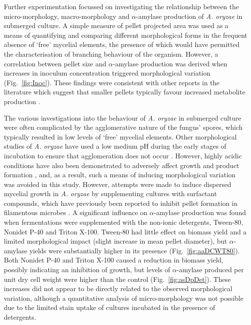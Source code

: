 Further experimentation focussed on investigating the relationship between the micro-morphology, macro-morphology and $\alpha$-amylase production of \emph{A. oryzae} in submerged culture. A simple measure of pellet projected area was used as a means of quantifying and comparing different morphological forms in the frequent absence of \lq free' mycelial elements, the presence of which would have permitted the characterisation of branching behaviour of the organism. However, a correlation between pellet size and $\alpha$-amylase production was derived when increases in inoculum concentration triggered morphological variation (Fig.~\ref{fig:Inoc}). These findings were consistent with other reports in the literature which suggest that smaller pellets typically favour increased metabolite production \cite{xu2000,jppark2002,couri2003,elenshasy2006}.

The various investigations into the behaviour of \emph{A. oryzae} in submerged culture were often complicated by the agglomerative nature of the fungus' spores, which typically resulted in low levels of \lq free' mycelial elements. Other morphological studies of \emph{A. oryzae} have used a low medium pH during the early stages of incubation to ensure that agglomeration does not occur \cite{carlsen1996a,muller2002}. However, highly acidic conditions have also been demonstrated to adversely affect growth and product formation \cite{carlsen1996a}, and, as a result, such a means of inducing morphological variation was avoided in this study. However, attempts were made to induce dispersed mycelial growth in \emph{A. oryzae} by supplementing cultures with surfactant compounds, which have previously been reported to inhibit pellet formation in filamentous microbes \cite{domingues2000,lucatero2004}. A significant influence on $\alpha$-amylase production was found when fermentations were supplemented with the non-ionic detergents, Tween-80, Nonidet P-40 and Triton X-100. Tween-80 had little effect on biomass yield and a limited morphological impact (slight increase in mean pellet diameter), but $\alpha$-amylase yields were substantially higher in its presence (Fig.~\ref{fig:aaDCWT80}). Both Nonidet P-40 and Triton X-100 caused a reduction in biomass yield, possibly indicating an inhibition of growth, but levels of $\alpha$-amylase produced per unit dry cell weight were higher than the control (Fig.~\ref{fig:asDpDet}). These increases did not appear to be directly related to the observed morphological variation, although a quantitative analysis of micro-morphology was not possible due to the limited stain uptake of cultures incubated in the presence of detergents.

